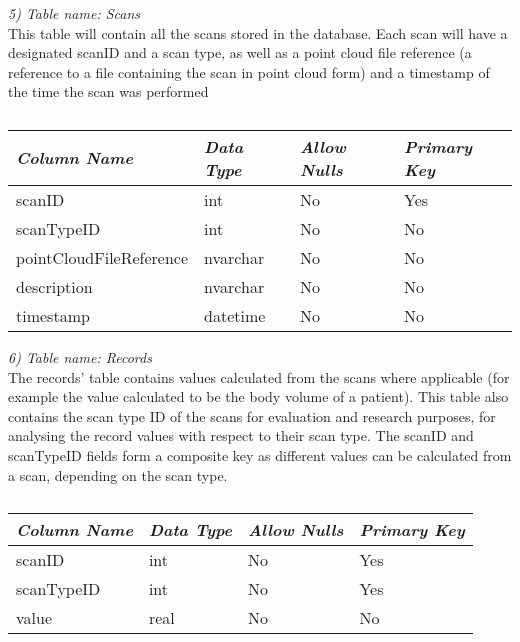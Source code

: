 \emph{5) Table name: Scans}\\

This table will contain all the scans stored in the database. Each scan will have a designated scanID and a scan type, as well as a point cloud file reference (a reference to a file containing the scan in point cloud form) and a timestamp of the time the scan was performed\\

\begin{table}[ht]
\centering
\begin{tabular}{| l | l | l | l |}
\hline
\emph{\bf{Column Name}} & \emph{\bf{Data Type}} & \emph{\bf{Allow Nulls}} & \emph{\bf{Primary Key}} \\\hline \hline
scanID & int & No & Yes \\\hline
scanTypeID & int & No & No \\\hline
pointCloudFileReference & nvarchar & No & No \\\hline
description & nvarchar & No & No \\\hline
timestamp & datetime & No & No \\\hline
\end{tabular}
\label{table:scans}
\caption[Database: Scans]{}
\end{table}

\emph{6) Table name: Records}\\

The records' table contains values calculated from the scans where applicable (for example the value calculated to be the body volume of a patient). This table also contains the scan type ID of the scans for evaluation and research purposes, for analysing the record values with respect to their scan type. The scanID and scanTypeID fields form a composite key as different values can be calculated from a scan, depending on the scan type.\\

\begin{table}[ht]
\centering
\begin{tabular}{| l | l | l | l |}
\hline
\emph{\bf{Column Name}} & \emph{\bf{Data Type}} & \emph{\bf{Allow Nulls}} & \emph{\bf{Primary Key}} \\\hline \hline
scanID & int & No & Yes \\\hline
scanTypeID & int & No & Yes \\\hline
value & real & No & No \\\hline
\end{tabular}
\label{table:records}
\caption[Database: Records]{}
\end{table}

